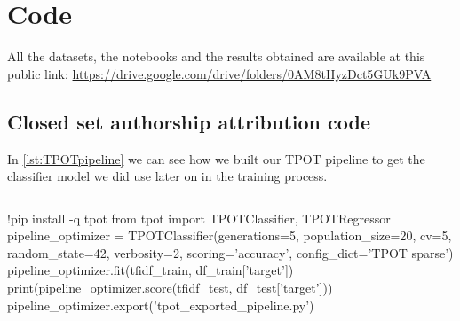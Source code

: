 \appendix
\chapter{Code}

All the datasets, the notebooks and the results obtained are available at this public link: \url{https://drive.google.com/drive/folders/0AM8tHyzDct5GUk9PVA}

\section{Closed set authorship attribution code}
In \autoref{lst:TPOTpipeline} we can see how we built our TPOT pipeline to get the classifier model we did use later on in the training process.

\begin{lstlisting}[frame=none,caption={TPOT pipeline generation.},captionpos=b,label=lst:TPOTpipeline]
\end{lstlisting}
\begin{python}	
	!pip install -q tpot
	from tpot import TPOTClassifier, TPOTRegressor
	pipeline_optimizer = TPOTClassifier(generations=5, population_size=20, cv=5,
	random_state=42, verbosity=2, scoring='accuracy', config_dict='TPOT sparse')
	pipeline_optimizer.fit(tfidf_train, df_train['target'])
	print(pipeline_optimizer.score(tfidf_test, df_test['target']))
	pipeline_optimizer.export('tpot_exported_pipeline.py')
\end{python}

